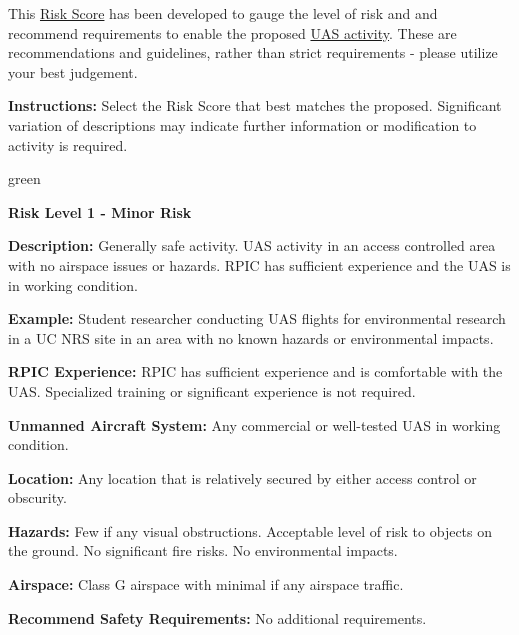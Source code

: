 \documentclass[
]{book}
\begin{document}
This \protect\hyperlink{riskscore}{Risk Score} has been developed to gauge the level of risk and and recommend requirements to enable the proposed \protect\hyperlink{UASactivity}{UAS activity}. These are recommendations and guidelines, rather than strict requirements - please utilize your best judgement.

\textbf{Instructions:} Select the Risk Score that best matches the proposed. Significant variation of descriptions may indicate further information or modification to activity is required.

\begin{content-box}{green}

\textbf{Risk Level 1 - Minor Risk}

\textbf{Description:} Generally safe activity. UAS activity in an access controlled area with no airspace issues or hazards. RPIC has sufficient experience and the UAS is in working condition.

\textbf{Example:} Student researcher conducting UAS flights for environmental research in a UC NRS site in an area with no known hazards or environmental impacts.

\textbf{RPIC Experience:} RPIC has sufficient experience and is comfortable with the UAS. Specialized training or significant experience is not required.

\textbf{Unmanned Aircraft System:} Any commercial or well-tested UAS in working condition.

\textbf{Location:} Any location that is relatively secured by either access control or obscurity.

\textbf{Hazards:} Few if any visual obstructions. Acceptable level of risk to objects on the ground. No significant fire risks. No environmental impacts.

\textbf{Airspace:} Class G airspace with minimal if any airspace traffic.

\textbf{Recommend Safety Requirements:} No additional requirements.

\end{content-box}
\end{document}
